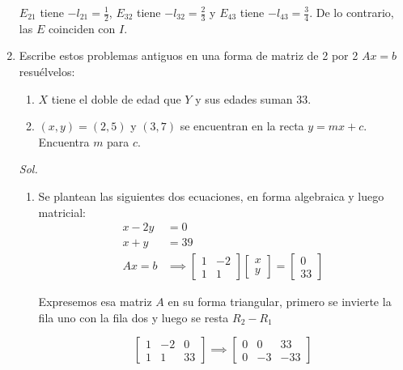 \begin{enumerate}
	      $E_{21}$ tiene $-l_{21}=\frac{1}{2}$, $E_{32}$ tiene $-l_{32}=\frac{2}{3}$ y $E_{43}$ tiene $-l_{43}=\frac{3}{4}$. De lo contrario, las $E$ coinciden con $I$.

	\item Escribe estos problemas antiguos en una forma de matriz de 2 por 2 $Ax = b$ resuélvelos:
	      \begin{enumerate}
		      \item $X$ tiene el doble de edad que $Y$ y sus edades suman 33.
		      \item $(x, y) = (2,5)$ y $(3,7)$ se encuentran en la recta $y = mx + c$. Encuentra $m$ para $c$.
	      \end{enumerate}

	      \textit{Sol. }

	      \begin{enumerate}
		      \item Se plantean las siguientes dos ecuaciones, en forma algebraica y luego matricial:
		            \begin{align*}
			            x-2y & =0       \\
			            x+y  & =39      \\
			            Ax=b & \implies
			            \begin{bmatrix}
				            1 & -2 \\1&1
			            \end{bmatrix} \begin{bmatrix}
				                          x \\y
			                          \end{bmatrix}= \begin{bmatrix}
				                                         0 \\33
			                                         \end{bmatrix}
		            \end{align*}

		            Expresemos esa matriz $A$ en su forma triangular, primero se invierte la fila uno con la fila dos y luego se resta $R_2 -R_{1}$

		            \begin{equation*}
			            \begin{bmatrix}
				            1 & -2 & 0 \\1&1&33
			            \end{bmatrix} \implies \begin{bmatrix}
				            0 & 0 & 33 \\0&-3&-33
			            \end{bmatrix}
		            \end{equation*}


\end{enumerate}
\end{enumerate}

